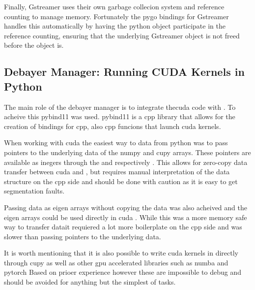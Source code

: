 Finally, Gstreamer uses their own garbage collecion system and reference counting to manage memory.
Fortunately the \gls{pygo} bindings for Gstreamer handles this automatically by having the python object participate in the reference counting, ensuring that the underlying Gstreamer object is not freed before the \py object is.


\subsection{Debayer Manager: Running CUDA Kernels in Python}
The main role of the debayer manager is to integrate the\gls{cuda} code with \py.
To acheive this \gls{pybind11} was used.
\gls{pybind11} is a \gls{cpp} library that allows for the creation of \py bindings for \gls{cpp}, also \gls{cpp} funcions that launch \gls{cuda} kernels.

When working with \gls{cuda} the easiest way to data from python was to pass pointers to the underlying data of the \gls{numpy} and \gls{cupy} arrays.
These pointers are available as inegers through the  and  respectively \cite{numpyArrayInterfaceProtocol} \cite{cupyInteroperabilityCuPy12}.
This allows for zero-copy data transfer between \gls{cuda} and \py, but requires manual interpretation of the data structure on the \gls{cpp} side and should be done with caution as it is easy to get segmentation faults.

Passing data as \gls{eigen} arrays without copying the data was also acheived and the \gls{eigen} arrays could be used directly in \gls{cuda} \cite{wenzelEigenPybind11Documentation2017} \cite{eigenEigenUsingEigen}.
While this was a more memory safe way to transfer datait requiered a lot more boilerplate on the \gls{cpp} side and was slower than passing pointers to the underlying data.


It is worth mentioning that it is also possible to write \gls{cuda} kernels in \py directly through \gls{cupy} as well as other \gls{gpu} accelerated libraries such as \gls{numba} and \gls{pytorch}
Based on prioer experience however these are impossible to debug and should be avoided for anything but the simplest of tasks.
